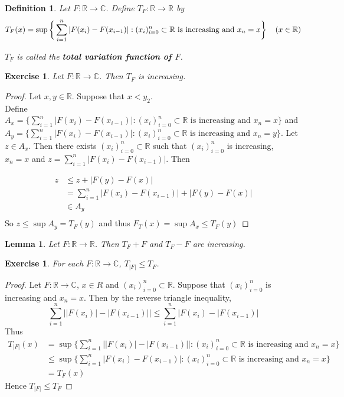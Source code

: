 \documentclass[12pt]{amsart}
\newtheorem{lem}[thm]{Lemma}
\newtheorem{defn}[thm]{Definition}
\newtheorem{ex}[thm]{Exercise}
\newcommand{\C}{\mathbb{C}}
\newcommand{\R}{\mathbb{R}}
\begin{document}
\begin{defn}
Let $F:\R \rightarrow \C$. Define $T_F:\R \rightarrow \R$ by $$T_F(x) = \sup\bigg \{\sum_{i=1}^{n}|F(x_{i}) - F(x_{i-1})|: (x_i)_{i=0}^n \subset \R \text{ is increasing and } x_n=x  \bigg \} \hspace{4mm} (x \in \R)$$

$T_F$ is called the \textbf{total variation function of $F$}.
\end{defn}

\begin{ex}
Let $F:\R \rightarrow \C$. Then $T_F$ is increasing.
\end{ex}

\begin{proof}
Let $x,y \in \R$. Suppose that $x<y_2$. \\Define  $A_x = \big \{\sum_{i=1}^{n}|F(x_{i}) - F(x_{i-1})|: (x_i)_{i=0}^n \subset \R \text{ is increasing and } x_n=x  \big \}$ and \\$A_y = \big \{\sum_{i=1}^{n}|F(x_{i}) - F(x_{i-1})|: (x_i)_{i=0}^n \subset \R \text{ is increasing and } x_n=y  \big \}$. Let $z \in A_x$. Then there exists $(x_i)_{i=0}^n \subset \R$ such that $(x_i)_{i=0}^n$ is increasing,\\ $x_n=x$ and $z = \sum_{i=1}^n |F(x_{i}) - F(x_{i-1})|$. Then

\begin{align*}
z 
& \leq z+|F(y)-F(x)|\\
&= \sum_{i=1}^n |F(x_{i}) - F(x_{i-1})| + |F(y)-F(x)|\\
& \in A_y\\
\end{align*} 
So $z \leq \sup A_y = T_F(y) $ and thus $F_T(x)  = \sup A_x \leq T_F(y)$
\end{proof}

\begin{lem}
Let $F:\R \rightarrow \R$. Then $T_F+F$ and $T_F-F$ are increasing.
\end{lem}

\begin{ex}
For each $F:\R \rightarrow \C$, $T_{|F|} \leq T_F$.
\end{ex}

\begin{proof}
Let $F:\R \rightarrow \C$, $x \in R$ and $(x_i)_{i=0}^n \subset \R$. Suppose that $(x_i)_{i=0}^n$ is increasing and $x_n=x$. Then by the reverse triangle inequality, $$ \sum_{i=1}^n\big||F(x_i)|-|F(x_{i-1})|\big|
\leq \sum_{i=1}^n\big|F(x_i)-|F(x_{i-1})\big|$$
Thus 
\begin{align*}
T_{|F|}(x) 
&= \sup\bigg \{\sum_{i=1}^{n}\big||F(x_{i})| - |F(x_{i-1})|\big|: (x_i)_{i=0}^n \subset \R \text{ is increasing and } x_n=x  \bigg \} \\
& \leq \sup\bigg \{\sum_{i=1}^{n}|F(x_{i}) - F(x_{i-1})|: (x_i)_{i=0}^n \subset \R \text{ is increasing and } x_n=x  \bigg \} \\
&= T_F(x)
\end{align*}
Hence $T_{|F|} \leq T_F$
\end{proof}
\end{document}

